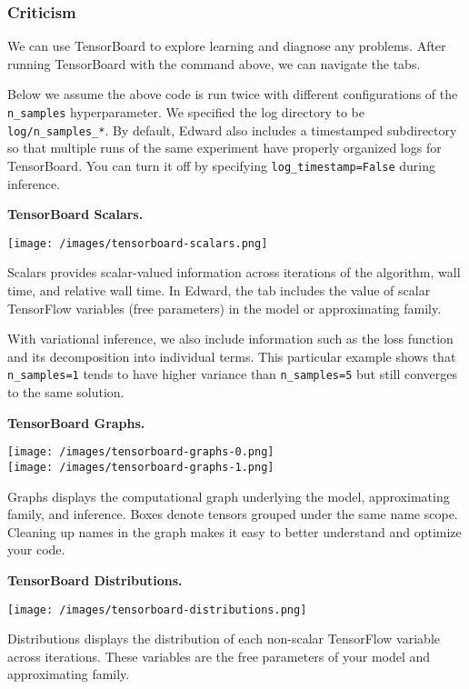\subsubsection{Criticism}

We can use TensorBoard to explore learning and diagnose any problems.
After running TensorBoard with the command above, we can navigate the
tabs.

Below we assume the above code is run twice with different
configurations
of the \texttt{n_samples} hyperparameter.
We specified the log directory to be \texttt{log/n_samples_*}.
By default, Edward also includes a timestamped subdirectory so that
multiple runs of the same experiment have properly organized logs for
TensorBoard. You can turn it off by specifying
\texttt{log_timestamp=False} during inference.

\textbf{TensorBoard Scalars.}

\texttt{[image: /images/tensorboard-scalars.png]}

Scalars provides scalar-valued information across iterations of the
algorithm, wall time, and relative wall time. In Edward, the tab
includes the value of scalar TensorFlow variables (free parameters) in
the model or approximating family.

With variational inference, we also include information such as the
loss function and its decomposition into individual terms. This
particular example shows that \texttt{n_samples=1} tends to have higher
variance than \texttt{n_samples=5} but still converges to the same solution.

\textbf{TensorBoard Graphs.}

\texttt{[image: /images/tensorboard-graphs-0.png]} \\
\texttt{[image: /images/tensorboard-graphs-1.png]}

Graphs displays the computational graph underlying the model,
approximating family, and inference. Boxes denote tensors grouped
under the same name scope. Cleaning up names in the graph makes it
easy to better understand and optimize your code.

\textbf{TensorBoard Distributions.}

\texttt{[image: /images/tensorboard-distributions.png]}

Distributions displays the distribution of each non-scalar TensorFlow
variable across iterations. These variables are the free parameters
of your model and approximating family.

